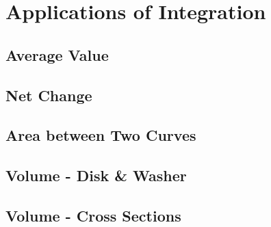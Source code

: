 \documentclass[../abcalc.tex]{subfiles}
\begin{document}
\chapter{Applications of Integration}
\section{Average Value}
\section{Net Change}
\section{Area between Two Curves}
\section{Volume - Disk \& Washer}
\section{Volume - Cross Sections}
\end{document}
